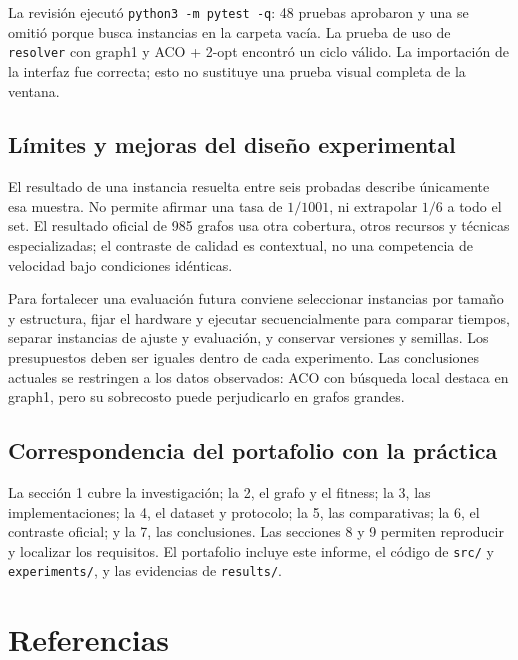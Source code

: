 \documentclass[
  spanish,
  12pt,
]{article}
\begin{document}
La revisión ejecutó \texttt{python3 -m pytest -q}: 48 pruebas aprobaron y una se omitió porque busca instancias en la carpeta vacía. La prueba de uso de \texttt{resolver} con graph1 y ACO + 2-opt encontró un ciclo válido. La importación de la interfaz fue correcta; esto no sustituye una prueba visual completa de la ventana.

\subsection{Límites y mejoras del diseño experimental}
El resultado de una instancia resuelta entre seis probadas describe únicamente esa muestra. No permite afirmar una tasa de $1/1001$, ni extrapolar $1/6$ a todo el set. El resultado oficial de 985 grafos usa otra cobertura, otros recursos y técnicas especializadas; el contraste de calidad es contextual, no una competencia de velocidad bajo condiciones idénticas.

Para fortalecer una evaluación futura conviene seleccionar instancias por tamaño y estructura, fijar el hardware y ejecutar secuencialmente para comparar tiempos, separar instancias de ajuste y evaluación, y conservar versiones y semillas. Los presupuestos deben ser iguales dentro de cada experimento. Las conclusiones actuales se restringen a los datos observados: ACO con búsqueda local destaca en graph1, pero su sobrecosto puede perjudicarlo en grafos grandes.

\subsection{Correspondencia del portafolio con la práctica}
La sección 1 cubre la investigación; la 2, el grafo y el fitness; la 3, las implementaciones; la 4, el dataset y protocolo; la 5, las comparativas; la 6, el contraste oficial; y la 7, las conclusiones. Las secciones 8 y 9 permiten reproducir y localizar los requisitos. El portafolio incluye este informe, el código de \texttt{src/} y \texttt{experiments/}, y las evidencias de \texttt{results/}.

\clearpage
\begingroup\small{}
\section{Referencias}\label{referencias}
\end{document}
